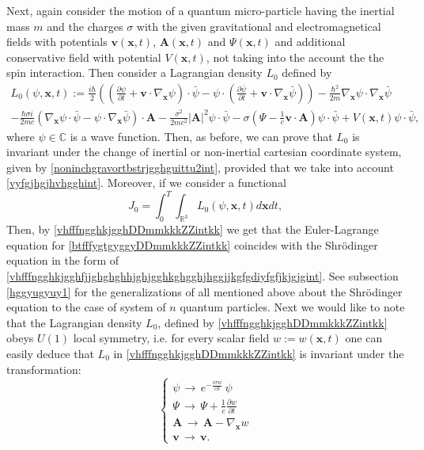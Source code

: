 \documentclass{article}
\theoremstyle{definition}
\theoremstyle{remark}
\renewcommand{\vec}[1]{\mathbf{#1}}
\newcommand{\er}{\eqref}
\newcommand{\er}{\eqref}
\begin{document}
Next, again consider the motion of a quantum micro-particle having
the inertial mass $m$ and the charges $\sigma$ with the given
gravitational and electromagnetical fields with potentials $\vec
v(\vec x,t)$, $\vec A(\vec x,t)$ and $\Psi(\vec x,t)$ and additional
conservative field with potential $V(\vec x,t)$, not taking into the
account the the spin interaction. Then consider a Lagrangian density
$L_0$ defined by
\begin{multline}\label{vhfffngghkjgghDDmmkkkZZintkk}
L_0\left(\psi,\vec x,t\right):=
\frac{i\hbar}{2}\left(\left(\frac{\partial\psi}{\partial t}+\vec
v\cdot\nabla_{\vec
x}\psi\right)\cdot\bar\psi-\psi\cdot\left(\frac{\partial\bar\psi}{\partial
t}+\vec v\cdot\nabla_{\vec
x}\bar\psi\right)\right)-\frac{\hbar^2}{2m}\nabla_{\vec
x}\psi\cdot\nabla_{\vec x}\bar\psi\\
-\frac{\hbar\sigma i}{2mc}\left(\nabla_{\vec
x}\psi\cdot\bar\psi-\psi\cdot\nabla_{\vec x}\bar\psi\right)\cdot\vec
A-\frac{\sigma^2}{2mc^2}\left|\vec A\right|^2\psi\cdot\bar\psi
-\sigma\left(\Psi-\frac{1}{c}\vec v\cdot\vec
A\right)\psi\cdot\bar\psi+V\left(\vec x,t\right)\psi\cdot\bar\psi,
\end{multline}
where $\psi\in \mathbb{C}$ is a wave function. Then, as before, we
can prove that $L_0$ is invariant under the change of inertial or
non-inertial cartesian coordinate system, given by
\er{noninchgravortbstrjgghguittu2int}, provided that we take into
account \er{vyfgjhgjhvhgghint}. Moreover, if we consider a
functional
\begin{equation}\label{btfffygtgyggyDDmmkkkZZintkk}
J_0=\int_0^T\int_{\mathbb{R}^3}L_0\left(\psi,\vec x,t\right)d\vec x
dt,
\end{equation}
Then, by \er{vhfffngghkjgghDDmmkkkZZintkk} we get that the
Euler-Lagrange equation for \er{btfffygtgyggyDDmmkkkZZintkk}
coincides with the Shr\"{o}dinger equation in the form of
\er{vhfffngghkjgghfjjghghghhjghjgghkghgghjhggjjkgfgdiyfgfjkjgjgint}.
See subsection \ref{hggyugyuy1} for the generalizations of all
mentioned above about the Shr\"{o}dinger equation to the case of
system of $n$ quantum particles. Next we would like to note that the
Lagrangian density $L_0$, defined by
\er{vhfffngghkjgghDDmmkkkZZintkk} obeys $U(1)$ local symmetry, i.e.
for every scalar field $w:=w(\vec x,t)$ one can easily deduce that
$L_0$ in \er{vhfffngghkjgghDDmmkkkZZintkk} is invariant under the
transformation:
\begin{equation}\label{MaxVacFull1bjkgjhjhgjgjgkjfhjfdghghligioiuittrPPNhjkjhkjgghhjjhjintiiihh}
\begin{cases}
\psi\,\to\,e^{-\frac{i\sigma w}{c\hbar}}\,\psi
\\
\Psi\,\to\,\Psi+\frac{1}{c}\frac{\partial w}{\partial t}\\
\vec A\,\to\,\vec A-\nabla_{\vec x}w\\
\vec v\,\to\,\vec v.
\end{cases}
\end{equation}
\end{document}
